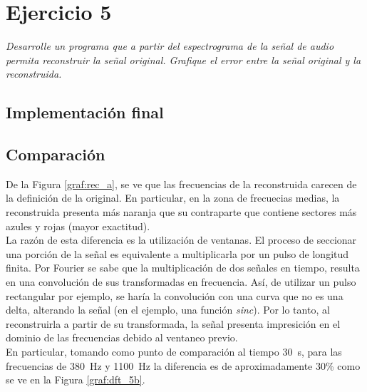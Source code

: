 
\pagebreak
\section{Ejercicio 5} \label{ej5}
	\begin{flushleft}
		\textit{Desarrolle un programa que a partir del espectrograma de la señal de audio permita
reconstruir la señal original. Grafique el error entre la señal original y la reconstruida.}
	\end{flushleft}

	\subsection{Implementación final}	
	

	\subsection{Comparación}


		De la Figura \ref{graf:rec_a}, se ve que las frecuencias de la reconstruida carecen de la definición de la original. En particular, en la zona de frecuecias medias, la reconstruida presenta más naranja que su contraparte que contiene sectores más azules y rojas (mayor exactitud).\\

		La razón de esta diferencia es la utilización de ventanas. El proceso de seccionar una porción de la señal es equivalente a multiplicarla por un pulso de longitud finita. Por Fourier se sabe que la multiplicación de dos señales en tiempo, resulta en una convolución de sus transformadas en frecuencia. Así, de utilizar un pulso rectangular por ejemplo, se haría la convolución con una curva que no es una delta, alterando la señal (en el ejemplo, una función \textit{sinc}). Por lo tanto, al reconstruirla a partir de su transformada, la señal presenta impresición en el dominio de las frecuencias debido al ventaneo previo.\\

		En particular, tomando como punto de comparación al tiempo \SI{30}{\s}, para las frecuencias de \SI{380}{\Hz} y \SI{1100}{\Hz} la diferencia es de aproximadamente 30\% como se ve en la Figura \ref{graf:dft_5b}.\\


